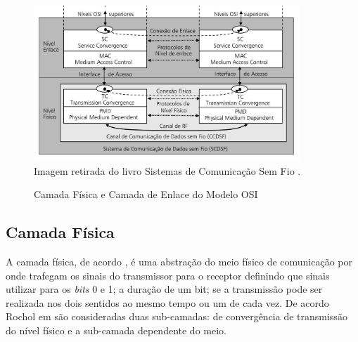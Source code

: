 \begin{figure}[ht]
	\begin{center}
		\caption{Camada Física e Camada de Enlace do Modelo OSI}
		\includegraphics[width=10cm]{./sections/textual/chapters/images/modelo_osi_1e2.png}\\
		Imagem retirada do livro Sistemas de Comunicação Sem Fio \cite{rochol2018sistemas}.
		\label{fig:modelo_osi_1e2}
	\end{center}
\end{figure}


\subsection{Camada Física}
A camada física, de acordo \cite{tanembaum2011}, é uma abstração do meio físico de comunicação por onde trafegam os sinais do transmissor para o receptor definindo que sinais utilizar para os \emph{bits} 0 e 1; a duração de um bit; se a transmissão pode ser realizada nos dois sentidos ao mesmo tempo ou um de cada vez. De acordo Rochol em \cite{rochol2018sistemas} são consideradas duas sub-camadas: de convergência de transmissão do nível físico e a sub-camada dependente do meio.


